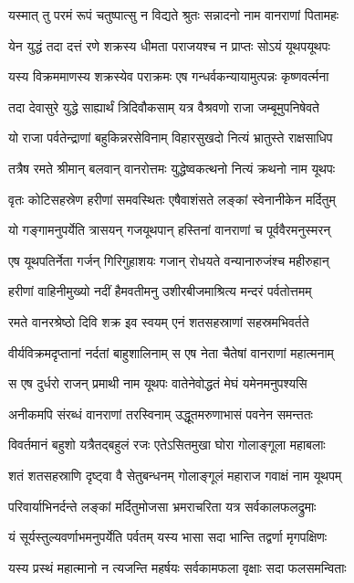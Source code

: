 \twolineshloka
{यस्मात् तु परमं रूपं चतुष्पात्सु न विद्यते}
{श्रुतः सन्नादनो नाम वानराणां पितामहः} %

\twolineshloka
{येन युद्धं तदा दत्तं रणे शक्रस्य धीमता}
{पराजयश्च न प्राप्तः सोऽयं यूथपयूथपः} %

\twolineshloka
{यस्य विक्रममाणस्य शक्रस्येव पराक्रमः}
{एष गन्धर्वकन्यायामुत्पन्नः कृष्णवर्त्मना} %

\twolineshloka
{तदा देवासुरे युद्धे साह्यार्थं त्रिदिवौकसाम्}
{यत्र वैश्रवणो राजा जम्बूमुपनिषेवते} %

\twolineshloka
{यो राजा पर्वतेन्द्राणां बहुकिन्नरसेविनाम्}
{विहारसुखदो नित्यं भ्रातुस्ते राक्षसाधिप} %

\twolineshloka
{तत्रैष रमते श्रीमान् बलवान् वानरोत्तमः}
{युद्धेष्वकत्थनो नित्यं क्रथनो नाम यूथपः} %

\twolineshloka
{वृतः कोटिसहस्रेण हरीणां समवस्थितः}
{एषैवाशंसते लङ्कां स्वेनानीकेन मर्दितुम्} %

\twolineshloka
{यो गङ्गामनुपर्येति त्रासयन् गजयूथपान्}
{हस्तिनां वानराणां च पूर्ववैरमनुस्मरन्} %

\twolineshloka
{एष यूथपतिर्नेता गर्जन् गिरिगुहाशयः}
{गजान् रोधयते वन्यानारुजंश्च महीरुहान्} %

\twolineshloka
{हरीणां वाहिनीमुख्यो नदीं हैमवतीमनु}
{उशीरबीजमाश्रित्य मन्दरं पर्वतोत्तमम्} %

\twolineshloka
{रमते वानरश्रेष्ठो दिवि शक्र इव स्वयम्}
{एनं शतसहस्राणां सहस्रमभिवर्तते} %

\twolineshloka
{वीर्यविक्रमदृप्तानां नर्दतां बाहुशालिनाम्}
{स एष नेता चैतेषां वानराणां महात्मनाम्} %

\twolineshloka
{स एष दुर्धरो राजन् प्रमाथी नाम यूथपः}
{वातेनेवोद्धतं मेघं यमेनमनुपश्यसि} %

\twolineshloka
{अनीकमपि संरब्धं वानराणां तरस्विनाम्}
{उद्धूतमरुणाभासं पवनेन समन्ततः} %

\twolineshloka
{विवर्तमानं बहुशो यत्रैतद्बहुलं रजः}
{एतेऽसितमुखा घोरा गोलाङ्गूला महाबलाः} %

\twolineshloka
{शतं शतसहस्राणि दृष्ट्वा वै सेतुबन्धनम्}
{गोलाङ्गूलं महाराज गवाक्षं नाम यूथपम्} %

\twolineshloka
{परिवार्याभिनर्दन्ते लङ्कां मर्दितुमोजसा}
{भ्रमराचरिता यत्र सर्वकालफलद्रुमाः} %

\twolineshloka
{यं सूर्यस्तुल्यवर्णाभमनुपर्येति पर्वतम्}
{यस्य भासा सदा भान्ति तद्वर्णा मृगपक्षिणः} %

\twolineshloka
{यस्य प्रस्थं महात्मानो न त्यजन्ति महर्षयः}
{सर्वकामफला वृक्षाः सदा फलसमन्विताः} %

